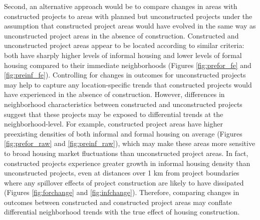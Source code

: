 \documentclass[12pt]{article}
\begin{document}
Second, an alternative approach would be to compare changes in areas with constructed projects to areas with planned but unconstructed projects under the assumption that constructed project areas would have evolved in the same way as unconstructed project areas in the absence of construction.  Constructed and unconstructed project areas appear to be located according to similar criteria: both have sharply higher levels of informal housing and lower levels of formal housing compared to their immediate neighborhoods (Figures \ref{fig:prefor_fe} and \ref{fig:preinf_fe}).  Controlling for changes in outcomes for unconstructed projects may help to capture any location-specific trends that constructed projects would have experienced in the absence of construction.  However,  differences in neighborhood characteristics between constructed and unconstructed projects suggest that these projects may be exposed to differential trends at the neighborhood-level.  For example, constructed project areas have higher preexisting densities of both informal and formal housing on average (Figures \ref{fig:prefor_raw} and \ref{fig:preinf_raw}), which may make these areas more sensitive to broad housing market fluctuations than unconstructed project areas.  In fact, constructed projects experience greater growth in informal housing density than unconstructed projects, even at distances over 1 km from project boundaries where any spillover effects of project construction are likely to have dissipated (Figures \ref{fig:forchange} and \ref{fig:infchange}).  Therefore, comparing changes in outcomes between constructed and constructed project areas may conflate differential neighborhood trends with the true effect of housing construction.
\end{document}
